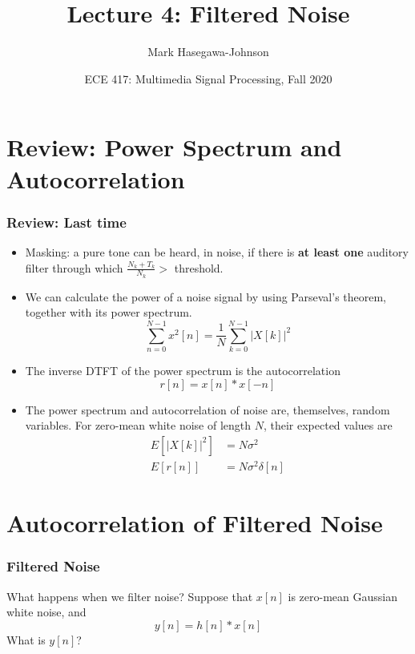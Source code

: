 \documentclass{beamer}
\title{Lecture 4: Filtered Noise}
\author{Mark Hasegawa-Johnson}
\date{ECE 417: Multimedia Signal Processing, Fall 2020}
\begin{document}
\begin{frame}
  \maketitle
\end{frame}

\begin{frame}
  \tableofcontents
\end{frame}

\section[Review]{Review: Power Spectrum and Autocorrelation}
\setcounter{subsection}{1}

\begin{frame}
  \frametitle{Review: Last time}
  \begin{itemize}
  \item Masking: a pure tone can be heard, in noise, if there is {\bf at least one}
    auditory filter through which $\frac{N_k+T_k}{N_k}>$ threshold.
  \item We can calculate the power of a noise signal by using Parseval's theorem, together with
    its power spectrum.
    \[
    \sum_{n=0}^{N-1}x^2[n] = \frac{1}{N}\sum_{k=0}^{N-1}|X[k]|^2
    \]
  \item The inverse DTFT of the power spectrum is the autocorrelation
    \[
    r[n] = x[n]\ast x[-n]
    \]
  \item The power spectrum and autocorrelation of noise are, themselves, random variables.
    For zero-mean white noise of length $N$, their expected values are
    \begin{align*}
      E\left[|X[k]|^2\right] &= N\sigma^2\\
      E\left[r[n]\right] &= N\sigma^2\delta[n]
    \end{align*}
  \end{itemize}
\end{frame}

\section[Autocorrelation]{Autocorrelation of Filtered Noise}
\setcounter{subsection}{1}

\begin{frame}
  \frametitle{Filtered Noise}

  What happens when we filter noise?  Suppose that $x[n]$ is zero-mean
  Gaussian white noise, and
  \[
  y[n] = h[n]\ast x[n]
  \]
  What is $y[n]$?
\end{frame}
\end{document}
